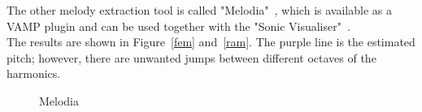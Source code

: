 \FloatBarrier
\noindent The other melody extraction tool is called "Melodia"~\cite{melodia1}, which is available as a VAMP plugin and can be used together with the "Sonic Visualiser"~\cite{sonviz1}.\\
The results are shown in Figure~\ref{fem} and~\ref{ram}.
The purple line is the estimated pitch; however, there are unwanted jumps between different octaves of the harmonics. 

\begin{figure}[htbp]
	\centering
	\caption{Melodia}
	\label{fig:melodia}
\end{figure}

